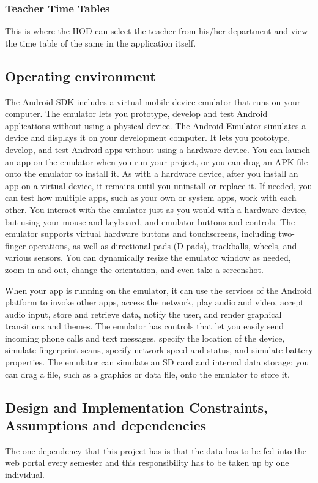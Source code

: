 \documentclass[BTech]{srmuthesis}
\begin{document}
\subsubsection{Teacher Time Tables}
This is where the HOD can select the teacher from his/her department and view the time table of the same in the application itself.
\subsection{Operating environment}
The Android SDK includes a virtual mobile device emulator that runs on your computer. The
emulator lets you prototype, develop and test Android applications without using a physical
device. The Android Emulator simulates a device and displays it on your development computer.
It lets you prototype, develop, and test Android apps without using a hardware device. You can
launch an app on the emulator when you run your project, or you can drag an APK file onto the
emulator to install it. As with a hardware device, after you install an app on a virtual device, it
remains until you uninstall or replace it. If needed, you can test how multiple apps, such as your
own or system apps, work with each other. You interact with the emulator just as you would with
a hardware device, but using your mouse and keyboard, and emulator buttons and controls. The
emulator supports virtual hardware buttons and touchscreens, including two-finger operations, as
well as directional pads (D-pads), trackballs, wheels, and various sensors. You can dynamically
resize the emulator window as needed, zoom in and out, change the orientation, and even take a
screenshot.

When your app is running on the emulator, it can use the services of the Android platform to
invoke other apps, access the network, play audio and video, accept audio input, store and
retrieve data, notify the user, and render graphical transitions and themes. The emulator has
controls that let you easily send incoming phone calls and text messages, specify the location of
the device, simulate fingerprint scans, specify network speed and status, and simulate battery
properties. The emulator can simulate an SD card and internal data storage; you can drag a file,
such as a graphics or data file, onto the emulator to store it.
\subsection{Design and Implementation Constraints, Assumptions and dependencies}
The one dependency that this project has is that the data has to be fed into the web portal every semester and this responsibility has to be taken up by one individual.
\end{document}
